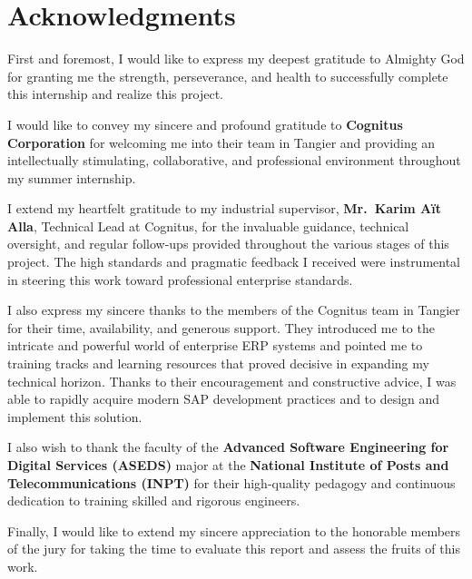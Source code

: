 \chapter*{Acknowledgments}

\noindent
First and foremost, I would like to express my deepest gratitude to Almighty God for granting me the strength, perseverance, and health to successfully complete this internship and realize this project.

\vspace{0.4cm}
\noindent
I would like to convey my sincere and profound gratitude to \textbf{Cognitus Corporation} for welcoming me into their team in Tangier and providing an intellectually stimulating, collaborative, and professional environment throughout my summer internship.

\vspace{0.4cm}
\noindent
I extend my heartfelt gratitude to my industrial supervisor, \textbf{Mr.\ Karim A\"it Alla}, Technical Lead at Cognitus, for the invaluable guidance, technical oversight, and regular follow-ups provided throughout the various stages of this project. The high standards and pragmatic feedback I received were instrumental in steering this work toward professional enterprise standards.

\vspace{0.4cm}
\noindent
I also express my sincere thanks to the members of the Cognitus team in Tangier for their time, availability, and generous support. They introduced me to the intricate and powerful world of enterprise ERP systems and pointed me to training tracks and learning resources that proved decisive in expanding my technical horizon. Thanks to their encouragement and constructive advice, I was able to rapidly acquire modern SAP development practices and to design and implement this solution.

\vspace{0.4cm}
\noindent
I also wish to thank the faculty of the \textbf{Advanced Software Engineering for Digital Services (ASEDS)} major at the \textbf{National Institute of Posts and Telecommunications (INPT)} for their high-quality pedagogy and continuous dedication to training skilled and rigorous engineers.

\vspace{0.4cm}
\noindent
Finally, I would like to extend my sincere appreciation to the honorable members of the jury for taking the time to evaluate this report and assess the fruits of this work.
